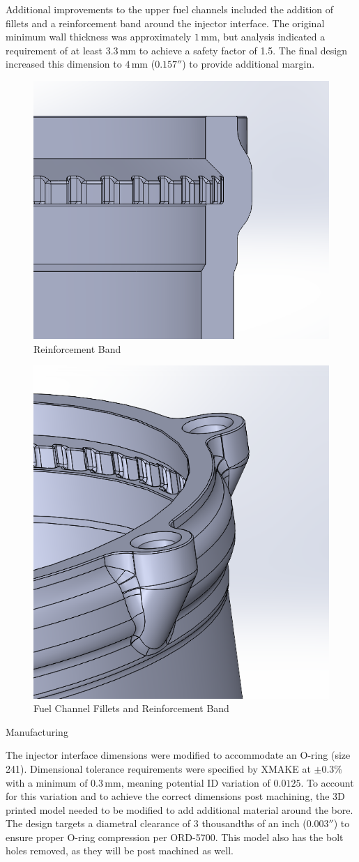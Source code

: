 Additional improvements to the upper fuel channels included the addition of fillets and a reinforcement band around the injector interface. The original minimum wall thickness was approximately $1\,\text{mm}$, but analysis indicated a requirement of at least $3.3\,\text{mm}$ to achieve a safety factor of 1.5. The final design increased this dimension to $4\,\text{mm}$ ($0.157''$) to provide additional margin.
\begin{figure}
    \centering
    \includegraphics[width=0.5\linewidth]{Images/image.png}
    \caption{Reinforcement Band}
    \label{fig:enter-label}
\end{figure}
\begin{figure}
    \centering
    \includegraphics[width=0.5\linewidth]{filletsandreinforementband.png}
    \caption{Fuel Channel Fillets and Reinforcement Band}
    \label{fig:enter-label}
\end{figure}

Manufacturing 

The injector interface dimensions were modified to accommodate an O-ring (size 241). Dimensional tolerance requirements were specified by XMAKE at $\pm0.3\%$ with a minimum of $0.3\,\text{mm}$, meaning potential ID variation of $0.0125$. To account for this variation and to achieve the correct dimensions post machining, the 3D printed model needed to be modified to add additional material around the bore.  The design targets a diametral clearance of 3 thousandths of an inch ($0.003''$) to ensure proper O-ring compression per ORD-5700.  This model also has the bolt holes removed, as they will be post machined as well. 

